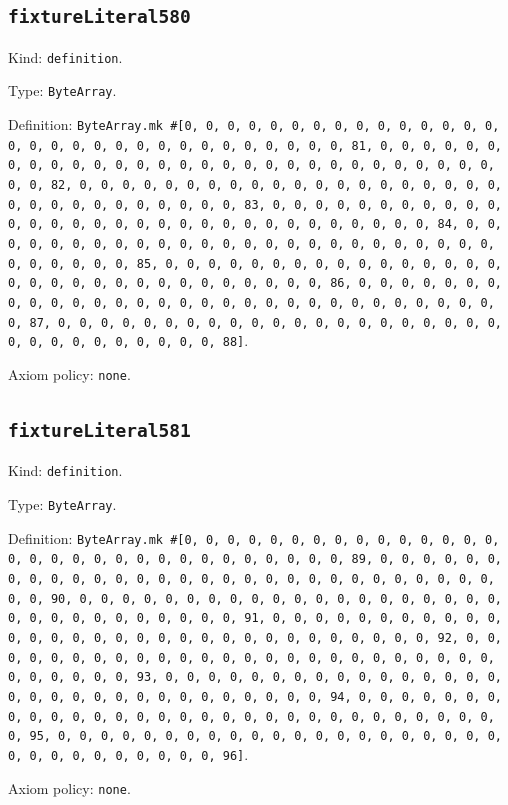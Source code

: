 \documentclass[11pt]{article}
\begin{document}
\subsection*{\texttt{fixtureLiteral580}}
\noindent Kind: \texttt{definition}.\par
\noindent Type: \texttt{ByteArray}.\par
\noindent Definition: \texttt{ByteArray.mk \#[0, 0, 0, 0, 0, 0, 0, 0, 0, 0, 0, 0, 0, 0, 0, 0, 0, 0, 0, 0, 0, 0, 0, 0, 0, 0, 0, 0, 0, 0, 0, 81, 0, 0, 0, 0, 0, 0, 0, 0, 0, 0, 0, 0, 0, 0, 0, 0, 0, 0, 0, 0, 0, 0, 0, 0, 0, 0, 0, 0, 0, 0, 0, 82, 0, 0, 0, 0, 0, 0, 0, 0, 0, 0, 0, 0, 0, 0, 0, 0, 0, 0, 0, 0, 0, 0, 0, 0, 0, 0, 0, 0, 0, 0, 0, 83, 0, 0, 0, 0, 0, 0, 0, 0, 0, 0, 0, 0, 0, 0, 0, 0, 0, 0, 0, 0, 0, 0, 0, 0, 0, 0, 0, 0, 0, 0, 0, 84, 0, 0, 0, 0, 0, 0, 0, 0, 0, 0, 0, 0, 0, 0, 0, 0, 0, 0, 0, 0, 0, 0, 0, 0, 0, 0, 0, 0, 0, 0, 0, 85, 0, 0, 0, 0, 0, 0, 0, 0, 0, 0, 0, 0, 0, 0, 0, 0, 0, 0, 0, 0, 0, 0, 0, 0, 0, 0, 0, 0, 0, 0, 0, 86, 0, 0, 0, 0, 0, 0, 0, 0, 0, 0, 0, 0, 0, 0, 0, 0, 0, 0, 0, 0, 0, 0, 0, 0, 0, 0, 0, 0, 0, 0, 0, 87, 0, 0, 0, 0, 0, 0, 0, 0, 0, 0, 0, 0, 0, 0, 0, 0, 0, 0, 0, 0, 0, 0, 0, 0, 0, 0, 0, 0, 0, 0, 0, 88]}.\par
\noindent Axiom policy: \texttt{none}.\par
\subsection*{\texttt{fixtureLiteral581}}
\noindent Kind: \texttt{definition}.\par
\noindent Type: \texttt{ByteArray}.\par
\noindent Definition: \texttt{ByteArray.mk \#[0, 0, 0, 0, 0, 0, 0, 0, 0, 0, 0, 0, 0, 0, 0, 0, 0, 0, 0, 0, 0, 0, 0, 0, 0, 0, 0, 0, 0, 0, 0, 89, 0, 0, 0, 0, 0, 0, 0, 0, 0, 0, 0, 0, 0, 0, 0, 0, 0, 0, 0, 0, 0, 0, 0, 0, 0, 0, 0, 0, 0, 0, 0, 90, 0, 0, 0, 0, 0, 0, 0, 0, 0, 0, 0, 0, 0, 0, 0, 0, 0, 0, 0, 0, 0, 0, 0, 0, 0, 0, 0, 0, 0, 0, 0, 91, 0, 0, 0, 0, 0, 0, 0, 0, 0, 0, 0, 0, 0, 0, 0, 0, 0, 0, 0, 0, 0, 0, 0, 0, 0, 0, 0, 0, 0, 0, 0, 92, 0, 0, 0, 0, 0, 0, 0, 0, 0, 0, 0, 0, 0, 0, 0, 0, 0, 0, 0, 0, 0, 0, 0, 0, 0, 0, 0, 0, 0, 0, 0, 93, 0, 0, 0, 0, 0, 0, 0, 0, 0, 0, 0, 0, 0, 0, 0, 0, 0, 0, 0, 0, 0, 0, 0, 0, 0, 0, 0, 0, 0, 0, 0, 94, 0, 0, 0, 0, 0, 0, 0, 0, 0, 0, 0, 0, 0, 0, 0, 0, 0, 0, 0, 0, 0, 0, 0, 0, 0, 0, 0, 0, 0, 0, 0, 95, 0, 0, 0, 0, 0, 0, 0, 0, 0, 0, 0, 0, 0, 0, 0, 0, 0, 0, 0, 0, 0, 0, 0, 0, 0, 0, 0, 0, 0, 0, 0, 96]}.\par
\noindent Axiom policy: \texttt{none}.\par
\end{document}
